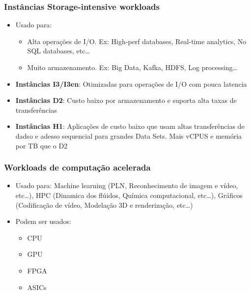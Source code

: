 \begin{frame}
	\frametitle{Instâncias Storage-intensive workloads}
	\begin{itemize}
		\item Usado para:
			\begin{itemize}
				\item Alta operações de I/O. Ex: High-perf databases, Real-time analytics, No SQL databases, etc\dots
				\item Muito armazenamento. Ex: Big Data, Kafka, HDFS, Log processing\dots
			\end{itemize}
		\item \textbf{Instâncias I3/I3en}: Otimizadas para operações de I/O com pouca latencia
		\item \textbf{Instâncias D2}: Custo baixo por armazenamento e suporta alta taxas de transferências
		\item \textbf{Instâncias H1}: Aplicações de custo baixo que usam altas transferências de dadso e adesso sequencial para grandes Data Sets. Mais vCPUS e memória por TB que o D2
	\end{itemize}
\end{frame}

\begin{frame}
	\frametitle{Workloads de computação acelerada}
	\begin{itemize}
		\item Usado para: Machine learning (PLN, Reconhecimento de imagem e vídeo, etc\dots), HPC (Dinamica dos flúidos, Química computacional, etc\dots), Gráficos (Codificação de vídeo, Modelação 3D e renderização, etc\dots)
		\item Podem ser usados:
			\begin{itemize}
				\item CPU
				\item GPU
				\item FPGA
				\item ASICs
			\end{itemize}
	\end{itemize}
\end{frame}

